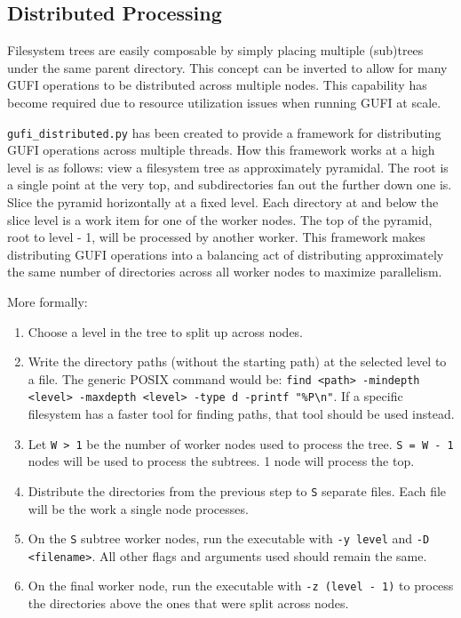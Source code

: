 \subsection{Distributed Processing}
\label{sec:distributed}

Filesystem trees are easily composable by simply placing multiple
(sub)trees under the same parent directory. This concept can be
inverted to allow for many GUFI operations to be distributed across
multiple nodes. This capability has become required due to resource
utilization issues when running GUFI at scale.

\texttt{gufi\_distributed.py} has been created to provide a framework
for distributing GUFI operations across multiple threads. How this
framework works at a high level is as follows: view a filesystem tree
as approximately pyramidal. The root is a single point at the very
top, and subdirectories fan out the further down one is. Slice the
pyramid horizontally at a fixed level. Each directory at and below the
slice level is a work item for one of the worker nodes. The top of the
pyramid, root to level - 1, will be processed by another worker. This
framework makes distributing GUFI operations into a balancing act of
distributing approximately the same number of directories across all
worker nodes to maximize parallelism.

More formally:

\begin{enumerate}
\item Choose a level in the tree to split up across nodes.
\item Write the directory paths (without the starting path) at the
  selected level to a file. The generic POSIX command would be:
  \texttt{find <path> -mindepth <level> -maxdepth <level> -type d
    -printf "\%P\textbackslash n"}. If a specific filesystem has a
  faster tool for finding paths, that tool should be used instead.
\item Let \texttt{W > 1} be the number of worker nodes used to process
  the tree. \texttt{S~=~W~-~1} nodes will be used to process the
  subtrees. 1 node will process the top.
\item Distribute the directories from the previous step to \texttt{S}
  separate files. Each file will be the work a single node processes.
\item On the \texttt{S} subtree worker nodes, run the executable with
  \texttt{-y level} and \texttt{-D <filename>}. All other flags and
  arguments used should remain the same.
\item On the final worker node, run the executable with \texttt{-z
  (level - 1)} to process the directories above the ones that were
  split across nodes.
\end{enumerate}

